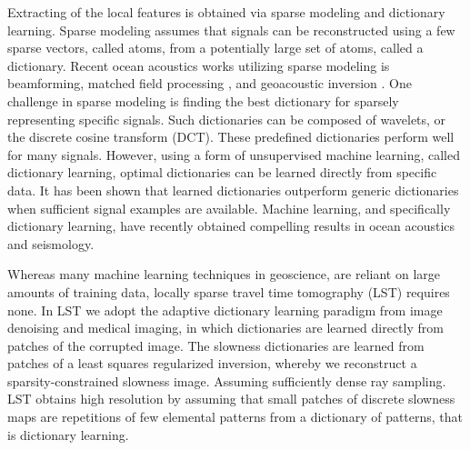Extracting of the local features is obtained via sparse modeling and dictionary learning.
Sparse modeling assumes that signals can be reconstructed using a few sparse vectors, called atoms, from a potentially large set of atoms, called a dictionary. Recent ocean acoustics works utilizing sparse modeling is beamforming\cite{Xenaki2014}, matched field processing \cite{Gemba2017}, and geoacoustic inversion \cite{gerstoft2018}. One challenge in sparse modeling is finding the best dictionary for sparsely representing specific signals. Such dictionaries can be composed of wavelets, or the discrete cosine transform (DCT). These predefined dictionaries perform well for many signals. However, using a form of unsupervised machine learning, called dictionary learning, optimal dictionaries can be learned directly from specific data\cite{mallat1999}. It has been shown that learned dictionaries outperform generic dictionaries when sufficient signal examples are available. Machine learning, and specifically dictionary learning, have recently obtained compelling results in ocean acoustics \cite{Bianco2017} and seismology\cite{kong2018}. 


Whereas many machine learning techniques in geoscience\cite{kong2018}, are reliant on large amounts of training data, locally sparse travel time tomography (LST)\cite{bianco2018} requires none. In LST we adopt the adaptive dictionary learning paradigm from image denoising \cite{elad2010} and medical imaging\cite{ravishankar2011}, in which dictionaries are learned directly from patches of the corrupted image. The slowness dictionaries are learned from patches of a least squares regularized inversion, whereby we reconstruct a sparsity-constrained slowness image. Assuming sufficiently dense ray sampling. LST\cite{bianco2018} obtains high resolution by assuming that small patches of discrete slowness maps are repetitions of few elemental patterns from a dictionary of patterns, that is dictionary learning. 

